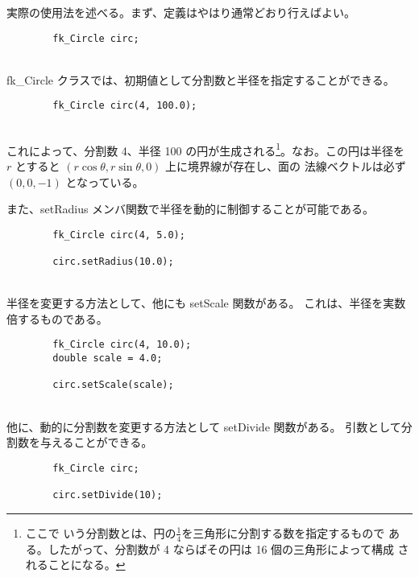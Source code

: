 実際の使用法を述べる。まず、定義はやはり通常どおり行えばよい。
\\
\begin{screen}
\begin{verbatim}
        fk_Circle circ;
\end{verbatim}
\end{screen}
~ \\
fk\_Circle クラスでは、初期値として分割数と半径を指定することができる。
\\
\begin{screen}
\begin{verbatim}
        fk_Circle circ(4, 100.0);
\end{verbatim}
\end{screen}
~ \\
これによって、分割数 4、半径 100 の円が生成される\footnote{ここで
いう分割数とは、円の\(\frac{1}{4}\)を三角形に分割する数を指定するもので
ある。したがって、分割数が 4 ならばその円は 16 個の三角形によって構成
されることになる。}。なお。この円は半径を \(r\) とすると
\( (r\cos \theta , r\sin \theta , 0)\) 上に境界線が存在し、面の
法線ベクトルは必ず \((0, 0, -1)\) となっている。

また、setRadius メンバ関数で半径を動的に制御することが可能である。
\\
\begin{screen}
\begin{verbatim}
        fk_Circle circ(4, 5.0);

        circ.setRadius(10.0);
\end{verbatim}
\end{screen}
~ \\
半径を変更する方法として、他にも setScale 関数がある。
これは、半径を実数倍するものである。
\\
\begin{breakbox}
\begin{verbatim}
        fk_Circle circ(4, 10.0);
        double scale = 4.0;

        circ.setScale(scale);
\end{verbatim}
\end{breakbox}
~ \\
他に、動的に分割数を変更する方法として setDivide 関数がある。
引数として分割数を与えることができる。
\\
\begin{breakbox}
\begin{verbatim}
        fk_Circle circ;

        circ.setDivide(10);
\end{verbatim}
\end{breakbox}
